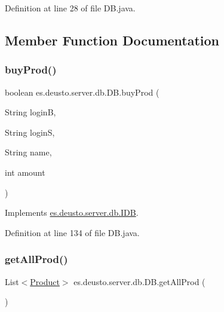 Definition at line 28 of file D\+B.\+java.



\subsection{Member Function Documentation}
\mbox{\label{classes_1_1deusto_1_1server_1_1db_1_1_d_b_a06ce3aee905784e5ec88a8945452548e}} 
\subsubsection{\texorpdfstring{buy\+Prod()}{buyProd()}}
{\footnotesize\ttfamily boolean es.\+deusto.\+server.\+db.\+D\+B.\+buy\+Prod (\begin{DoxyParamCaption}\item[{String}]{loginB,  }\item[{String}]{loginS,  }\item[{String}]{name,  }\item[{int}]{amount }\end{DoxyParamCaption})}



Implements \hyperlink{interfacees_1_1deusto_1_1server_1_1db_1_1_i_d_b_a64b43ced1334b833f7ee557badd2c5b7}{es.\+deusto.\+server.\+db.\+I\+DB}.



Definition at line 134 of file D\+B.\+java.

\mbox{\label{classes_1_1deusto_1_1server_1_1db_1_1_d_b_aa193a59efe6c2458d89fd751da935a3a}} 
\subsubsection{\texorpdfstring{get\+All\+Prod()}{getAllProd()}}
{\footnotesize\ttfamily List$<$\hyperlink{classes_1_1deusto_1_1server_1_1db_1_1data_1_1_product}{Product}$>$ es.\+deusto.\+server.\+db.\+D\+B.\+get\+All\+Prod (\begin{DoxyParamCaption}{ }\end{DoxyParamCaption})}



